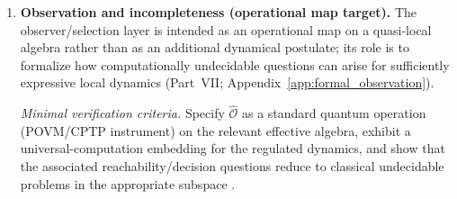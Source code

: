 \begin{enumerate}
    \item \textbf{Observation and incompleteness (operational map target).}
    The observer/selection layer is intended as an operational map on a quasi-local algebra rather than as an additional dynamical postulate; its role is to formalize how computationally undecidable questions can arise for sufficiently expressive local dynamics (Part~VII; Appendix~\ref{app:formal_observation}).\par
    \textit{Minimal verification criteria.} Specify $\hat{\mathcal{O}}$ as a standard quantum operation (POVM/CPTP instrument) on the relevant effective algebra, exhibit a universal-computation embedding for the regulated dynamics, and show that the associated reachability/decision questions reduce to classical undecidable problems in the appropriate subspace \cite{NielsenChuang2000,Moore1990Unpredictability,Kari1994Reversibility,CubittPerezGarciaWolf2015SpectralGap}.
\end{enumerate}
